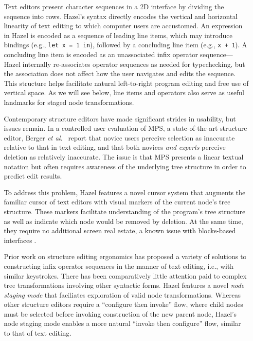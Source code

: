 \documentclass[format=sigplan,dvipsnames,backend=bibtex]{acmart}
\newcommand{\Hazel}{\textsf{Hazel}\xspace}
\begin{document}
Text editors present character sequences in a 2D interface by dividing the
	sequence into rows.
\Hazel's syntax directly encodes the vertical and horizontal linearity of text
	editing to which computer users are accustomed.
An expression in \Hazel is encoded as a sequence of leading line items, which may
	introduce bindings (e.g., \texttt{let x = 1 in}), followed by a concluding line
	item (e.g., \texttt{x + 1}).
A concluding line item is encoded as an unassociated infix operator sequence---\Hazel 
	internally re-associates operator sequences as needed for typechecking, but the
	association does not affect how the user navigates and edits the sequence.
This structure helps facilitate natural left-to-right program editing and free use of
	vertical space.
As we will see below, line items and operators also serve as useful landmarks for staged
	node transformations.

Contemporary structure editors have made significant strides in usability, but
	issues remain.
In a controlled user evaluation of MPS, a state-of-the-art structure editor,
	Berger \emph{et al.}~ \cite{ProjEfficiency}
	report that novice users perceive selection as inaccurate relative to that in text
	editing, and that both novices \emph{and experts} perceive deletion as relatively inaccurate.
The issue is that MPS presents a linear textual notation but often requires awareness of the 
	underlying tree structure in order to predict edit results.

To address this problem, \Hazel features a novel cursor system that augments the familiar
	cursor of text editors with visual markers of the current node's tree structure.
These markers facilitate understanding of the program's tree structure as well as indicate
	which node would be removed by deletion.
At the same time, they require no additional screen real estate, a known issue with
	blocks-based interfaces \cite{BlocksFingertips}.

Prior work on structure editing ergonomics has proposed a variety of solutions to 
	constructing infix operator sequences in the manner of text editing, i.e., with similar 
	keystrokes.
There has been comparatively little attention paid to complex tree transformations involving other 
	syntactic forms.
\Hazel features a novel \emph{node staging mode} that faciliates exploration of valid
	node transformations.
Whereas other structure editors require a ``configure then invoke'' flow, where child
	nodes must be selected before invoking construction of the new parent node, \Hazel's
	node staging mode enables a more natural ``invoke then configure'' flow, similar to
	that of text editing.
\end{document}
